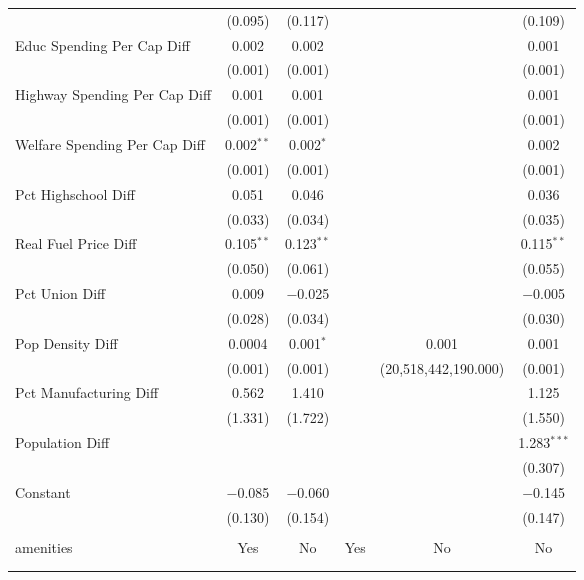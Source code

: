 \begin{table}[!htbp]
\begin{tabular}{@{\extracolsep{5pt}}lccccc}
  & (0.095) & (0.117) &  &  & (0.109) \\ 
  Educ Spending Per Cap Diff & 0.002 & 0.002 &  &  & 0.001 \\ 
  & (0.001) & (0.001) &  &  & (0.001) \\ 
  Highway Spending Per Cap Diff & 0.001 & 0.001 &  &  & 0.001 \\ 
  & (0.001) & (0.001) &  &  & (0.001) \\ 
  Welfare Spending Per Cap Diff & 0.002$^{**}$ & 0.002$^{*}$ &  &  & 0.002 \\ 
  & (0.001) & (0.001) &  &  & (0.001) \\ 
  Pct Highschool Diff & 0.051 & 0.046 &  &  & 0.036 \\ 
  & (0.033) & (0.034) &  &  & (0.035) \\ 
  Real Fuel Price Diff & 0.105$^{**}$ & 0.123$^{**}$ &  &  & 0.115$^{**}$ \\ 
  & (0.050) & (0.061) &  &  & (0.055) \\ 
  Pct Union Diff & 0.009 & $-$0.025 &  &  & $-$0.005 \\ 
  & (0.028) & (0.034) &  &  & (0.030) \\ 
  Pop Density Diff & 0.0004 & 0.001$^{*}$ &  & 0.001 & 0.001 \\ 
  & (0.001) & (0.001) &  & (20,518,442,190.000) & (0.001) \\ 
  Pct Manufacturing Diff & 0.562 & 1.410 &  &  & 1.125 \\ 
  & (1.331) & (1.722) &  &  & (1.550) \\ 
  Population Diff &  &  &  &  & 1.283$^{***}$ \\ 
  &  &  &  &  & (0.307) \\ 
  Constant & $-$0.085 & $-$0.060 &  &  & $-$0.145 \\ 
  & (0.130) & (0.154) &  &  & (0.147) \\ 
 \hline \\[-1.8ex] 
amenities & Yes & No & Yes & No & No \\ 
\hline \\[-1.8ex] 
\hline 
\hline \\[-1.8ex] 
\end{tabular} 
\end{table} 
